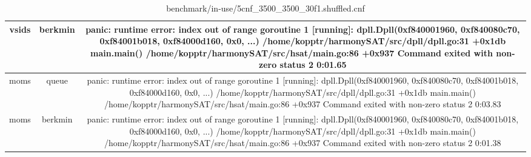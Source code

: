 \documentclass{article}
\begin{document}
\begin{table}[ht!]
{\begin{tabular}{|c|c||c|}
vsids & berkmin & panic: runtime error: index out of range goroutine 1 [running]: dpll.Dpll(0xf840001960, 0xf840080c70, 0xf84001b018, 0xf84000d160, 0x0, ...) /home/kopptr/harmonySAT/src/dpll/dpll.go:31 +0x1db main.main() /home/kopptr/harmonySAT/src/hsat/main.go:86 +0x937 Command exited with non-zero status 2 0:01.65\\\hline
moms & queue & panic: runtime error: index out of range goroutine 1 [running]: dpll.Dpll(0xf840001960, 0xf840080c70, 0xf84001b018, 0xf84000d160, 0x0, ...) /home/kopptr/harmonySAT/src/dpll/dpll.go:31 +0x1db main.main() /home/kopptr/harmonySAT/src/hsat/main.go:86 +0x937 Command exited with non-zero status 2 0:03.83\\\hline
moms & berkmin & panic: runtime error: index out of range goroutine 1 [running]: dpll.Dpll(0xf840001960, 0xf840080c70, 0xf84001b018, 0xf84000d160, 0x0, ...) /home/kopptr/harmonySAT/src/dpll/dpll.go:31 +0x1db main.main() /home/kopptr/harmonySAT/src/hsat/main.go:86 +0x937 Command exited with non-zero status 2 0:01.38\\\hline
\end{tabular}
}
\caption{benchmark/in-use/5cnf_3500_3500_30f1.shuffled.cnf}
\label{tab:benchmark/in-use/5cnf_3500_3500_30f1.shuffled.cnf}
\end{table}

\begin{table}[ht!]
\centering
{}
\caption{benchmark/in-use/5cnf_3900_3900_060.shuffled.cnf}
\label{tab:benchmark/in-use/5cnf_3900_3900_060.shuffled.cnf}
\end{table}
\end{document}
